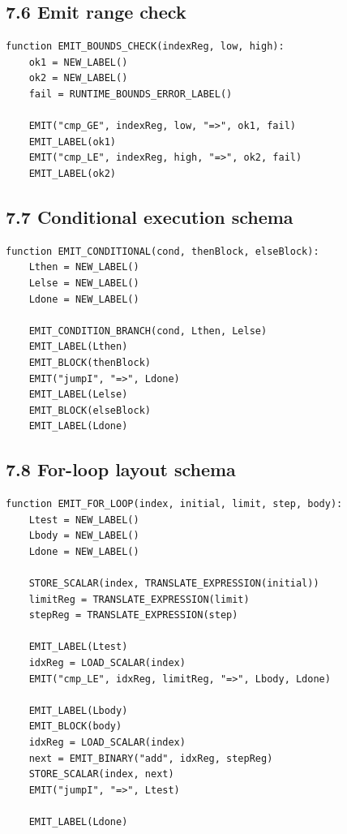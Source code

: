\documentclass[10pt,letterpaper]{article}
\begin{document}
\subsection*{7.6 Emit range check}

\begin{verbatim}
function EMIT_BOUNDS_CHECK(indexReg, low, high):
    ok1 = NEW_LABEL()
    ok2 = NEW_LABEL()
    fail = RUNTIME_BOUNDS_ERROR_LABEL()

    EMIT("cmp_GE", indexReg, low, "=>", ok1, fail)
    EMIT_LABEL(ok1)
    EMIT("cmp_LE", indexReg, high, "=>", ok2, fail)
    EMIT_LABEL(ok2)
\end{verbatim}

\subsection*{7.7 Conditional execution schema}

\begin{verbatim}
function EMIT_CONDITIONAL(cond, thenBlock, elseBlock):
    Lthen = NEW_LABEL()
    Lelse = NEW_LABEL()
    Ldone = NEW_LABEL()

    EMIT_CONDITION_BRANCH(cond, Lthen, Lelse)
    EMIT_LABEL(Lthen)
    EMIT_BLOCK(thenBlock)
    EMIT("jumpI", "=>", Ldone)
    EMIT_LABEL(Lelse)
    EMIT_BLOCK(elseBlock)
    EMIT_LABEL(Ldone)
\end{verbatim}

\subsection*{7.8 For-loop layout schema}

\begin{verbatim}
function EMIT_FOR_LOOP(index, initial, limit, step, body):
    Ltest = NEW_LABEL()
    Lbody = NEW_LABEL()
    Ldone = NEW_LABEL()

    STORE_SCALAR(index, TRANSLATE_EXPRESSION(initial))
    limitReg = TRANSLATE_EXPRESSION(limit)
    stepReg = TRANSLATE_EXPRESSION(step)

    EMIT_LABEL(Ltest)
    idxReg = LOAD_SCALAR(index)
    EMIT("cmp_LE", idxReg, limitReg, "=>", Lbody, Ldone)

    EMIT_LABEL(Lbody)
    EMIT_BLOCK(body)
    idxReg = LOAD_SCALAR(index)
    next = EMIT_BINARY("add", idxReg, stepReg)
    STORE_SCALAR(index, next)
    EMIT("jumpI", "=>", Ltest)

    EMIT_LABEL(Ldone)
\end{verbatim}
\end{document}

